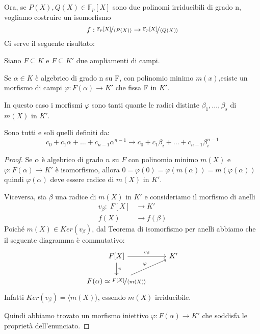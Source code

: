 \documentclass[../main.tex]{subfiles}
\begin{document}
Ora, se $P(X), Q(X) \in \mathbb{F}_p[X]$ sono due polinomi irriducibili di grado n, vogliamo costruire un isomorfismo
\begin{equation*}
    f: \nicefrac{\mathbb{F}_p[X]}{\langle P(X)\rangle} \rightarrow \nicefrac{\mathbb{F}_p[X]}{\langle Q(X)\rangle}
\end{equation*}
Ci serve il seguente risultato:

\begin{proposition}
    Siano $F \subseteq K$ e $F \subseteq K'$ due ampliamenti di campi.

    Se $\alpha \in K$ è algebrico di grado n su F, con polinomio minimo $m(x)$,esiste un morfismo di campi $\varphi : F(\alpha) \rightarrow K'$ che fissa F in $K'$.

    In questo caso i morfismi $\varphi$ sono tanti quante le radici distinte $\beta_1, \ldots ,\beta_s$ di $m(X)$ in $K'$.

    Sono tutti e soli quelli definiti da:
    \begin{equation*}
        c_0 + c_1\alpha + \ldots + c_{n-1}\alpha^{n-1} \rightarrow c_0 + c_1\beta_i + \ldots + c_{n-1}\beta_i^{n-1}
    \end{equation*}
\end{proposition}

\begin{proof}
    Se $\alpha$ è algebrico di grado $n$ su $F$ con polinomio minimo $m(X)$ e $\varphi : F(\alpha) \rightarrow K'$ è isomorfismo, allora $0 = \varphi(0) = \varphi(m(\alpha)) = m(\varphi(\alpha))$  quindi $\varphi(\alpha)$ deve essere radice di $m(X)$ in $K'$.

    Viceversa, sia $\beta$ una radice di $m(X)$ in $K'$ e consideriamo il morfismo di anelli
    \begin{align*}
        v_\beta : \; F[X] & \rightarrow K'       \\
        f(X)              & \rightarrow f(\beta)
    \end{align*}
    Poiché $m(X) \in Ker(v_\beta)$, dal Teorema di isomorfismo per anelli abbiamo che il seguente diagramma è commutativo:
    \begin{equation*}
        \begin{tikzcd}
            F[X] \arrow{r}{v_\beta} \arrow{d}{\pi} & K'\\
            F(\alpha) \simeq \nicefrac{F[X]}{\langle m(X)\rangle} \arrow{ur}{\varphi}
        \end{tikzcd}
    \end{equation*}
    Infatti $Ker(v_\beta) = \langle m(X)\rangle$, essendo $m(X)$ irriducibile.

    Quindi abbiamo trovato un morfismo iniettivo $\varphi : F(\alpha) \rightarrow K'$ che soddisfa le proprietà dell'enunciato.
\end{proof}
\end{document}
